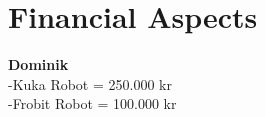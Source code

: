 \chapter{Financial Aspects}\label{chap:financial_aspects_chapter}

\textbf{Dominik}\\

-Kuka Robot = 250.000 kr\\
-Frobit Robot = 100.000 kr\\

